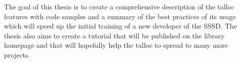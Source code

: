 The goal of this thesis is to create a comprehensive description of the talloc
features with code samples and a summary of the best practices of its usage
which will speed up the initial training of a new developer of the SSSD. The
thesis also aims to create a tutorial that will be published on the library
homepage and that will hopefully help the talloc to spread to many more projects.

% 
% 
% 
